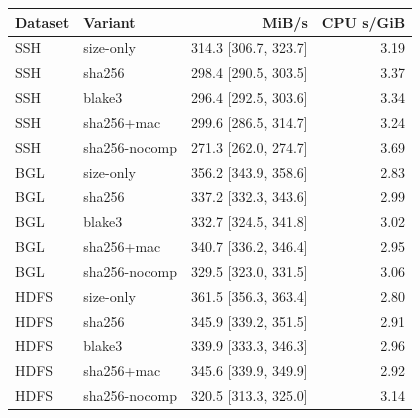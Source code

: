
\begin{tabular}{@{}llrr@{}}
\toprule
Dataset & Variant & MiB/s & CPU s/GiB \\
\midrule
SSH & size-only & 314.3 [306.7, 323.7] & 3.19 \\
SSH & sha256 & 298.4 [290.5, 303.5] & 3.37 \\
SSH & blake3 & 296.4 [292.5, 303.6] & 3.34 \\
SSH & sha256+mac & 299.6 [286.5, 314.7] & 3.24 \\
SSH & sha256-nocomp & 271.3 [262.0, 274.7] & 3.69 \\
\addlinespace
BGL & size-only & 356.2 [343.9, 358.6] & 2.83 \\
BGL & sha256 & 337.2 [332.3, 343.6] & 2.99 \\
BGL & blake3 & 332.7 [324.5, 341.8] & 3.02 \\
BGL & sha256+mac & 340.7 [336.2, 346.4] & 2.95 \\
BGL & sha256-nocomp & 329.5 [323.0, 331.5] & 3.06 \\
\addlinespace
HDFS & size-only & 361.5 [356.3, 363.4] & 2.80 \\
HDFS & sha256 & 345.9 [339.2, 351.5] & 2.91 \\
HDFS & blake3 & 339.9 [333.3, 346.3] & 2.96 \\
HDFS & sha256+mac & 345.6 [339.9, 349.9] & 2.92 \\
HDFS & sha256-nocomp & 320.5 [313.3, 325.0] & 3.14 \\
\bottomrule
\end{tabular}
